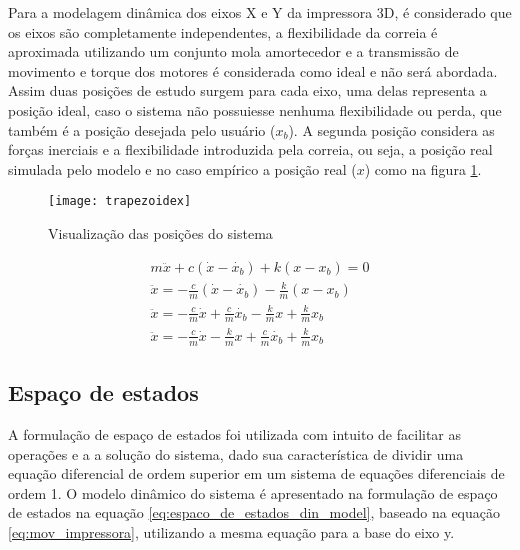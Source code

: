 Para a modelagem dinâmica dos eixos X e Y da impressora 3D, 
é considerado que os eixos são completamente independentes, 
a flexibilidade da correia é aproximada utilizando um conjunto 
mola amortecedor e a transmissão de movimento e torque dos 
motores é considerada como ideal e não será abordada.
Assim duas posições de estudo surgem para cada eixo, uma delas 
representa a posição ideal, caso o sistema não possuiesse nenhuma flexibilidade
ou perda, que também é a posição desejada pelo usuário ($x_b$). 
A segunda posição considera as forças inerciais e a 
flexibilidade introduzida pela correia, ou seja, a posição real simulada pelo modelo
e no caso empírico a posição real ($x$) como na figura \ref{fig:din_model}.


\begin{figure}[!htb]
    \centering
    \caption{Visualização das posições do sistema}
    \texttt{[image: trapezoidex]}

    \label{fig:din_model}
\end{figure}

\begin{multline}
    \label{eq:mov_impressora}
    m \ddot{x} + c(\dot{x} - \dot{x_b}) + k(x-x_b) = 0 \\
    \ddot{x}  = - \frac{c}{m}(\dot{x} - \dot{x_b}) - \frac{k}{m}(x-x_b) \\
    \ddot{x}  = - \frac{c}{m} \dot{x} + \frac{c}{m} \dot
    {x_b} - \frac{k}{m} x + \frac{k}{m} x_b \\
    \ddot{x}  = - \frac{c}{m} \dot{x} - \frac{k}{m} x + \frac{c}{m} \dot{x_b} + \frac{k}{m} x_b
\end{multline}

\subsection{Espaço de estados}
A formulação de espaço de estados foi utilizada com intuito de facilitar as operações e
a a solução do sistema, dado sua característica de dividir uma equação diferencial
de ordem superior em um sistema de equações diferenciais de ordem 1.
O modelo dinâmico do sistema é apresentado na formulação de espaço de estados 
na equação \ref{eq:espaco_de_estados_din_model}, baseado na equação \ref{eq:mov_impressora},
utilizando a mesma equação para a base do eixo y.

